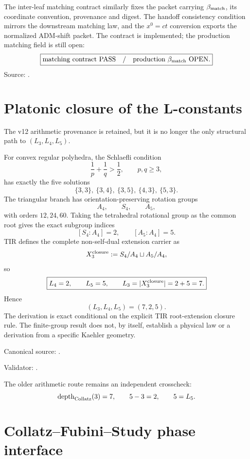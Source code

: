 The inter-leaf matching contract similarly fixes the packet carrying
\(\beta_{\rm match}\), its coordinate convention, provenance and digest.  The
handoff consistency condition mirrors the downstream matching law, and the
\(x^0=ct\) conversion exports the normalized ADM-shift packet.  The contract is
implemented; the production matching field is still open:
\[
\boxed{
\text{matching contract PASS}
\quad/\quad
\text{production }\beta_{\rm match}\text{ OPEN}.
}
\]
Source:
.

\section{Platonic closure of the L-constants}

The v12 arithmetic provenance is retained, but it is no longer the only
structural path to \((L_3,L_4,L_5)\).

For convex regular polyhedra, the Schlaefli condition
\[
\frac1p+\frac1q>\frac12,
\qquad p,q\ge3,
\]
has exactly the five solutions
\[
\{3,3\},\ \{3,4\},\ \{3,5\},\ \{4,3\},\ \{5,3\}.
\]
The triangular branch has orientation-preserving rotation groups
\[
A_4,\qquad S_4,\qquad A_5,
\]
with orders \(12,24,60\).  Taking the tetrahedral rotational group as the
common root gives the exact subgroup indices
\[
\boxed{[S_4:A_4]=2},
\qquad
\boxed{[A_5:A_4]=5}.
\]
TIR defines the complete non-self-dual extension carrier as
\[
X_3^{\rm closure}
:=S_4/A_4\sqcup A_5/A_4,
\]
so
\[
\boxed{
L_4=2,
\qquad L_5=5,
\qquad L_3=|X_3^{\rm closure}|=2+5=7.
}
\]
Hence
\[
\boxed{(L_3,L_4,L_5)=(7,2,5)}.
\]
The derivation is exact conditional on the explicit TIR root-extension closure
rule.  The finite-group result does not, by itself, establish a physical law or
a derivation from a specific Kaehler geometry.

Canonical source:
.

Validator:
.

The older arithmetic route remains an independent crosscheck:
\[
\operatorname{depth}_{\rm Collatz}(3)=7,
\qquad 5-3=2,
\qquad 5=L_5.
\]

\section{Collatz--Fubini--Study phase interface}


